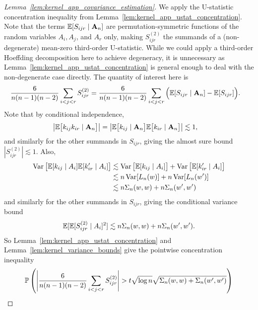 \begin{proof}[Lemma~\ref{lem:kernel_app_covariance_estimation}]
  We apply the U-statistic concentration inequality from
  Lemma~\ref{lem:kernel_app_ustat_concentration}.
  Note that the terms
  $\mathbb{E}[S_{i j r} \mid \mathbf{A}_n]$
  are permutation-symmetric functions of
  the random variables
  $A_i, A_j$, and $A_r$ only,
  making $S_{i j r}^{(2)}$ the summands of
  a (non-degenerate) mean-zero third-order U-statistic.
  While we could apply a third-order Hoeffding decomposition
  here to achieve degeneracy,
  it is unnecessary as Lemma~\ref{lem:kernel_app_ustat_concentration}
  is general enough to deal with the non-degenerate case directly.
  The quantity of interest here is
  \begin{align*}
    \frac{6}{n(n-1)(n-2)}
    \sum_{i<j<r}
    S_{i j r}^{(2)}
    &=
    \frac{6}{n(n-1)(n-2)}
    \sum_{i<j<r}
    \Big(
      \mathbb{E}[S_{i j r} \mid \mathbf{A}_n]
      - \mathbb{E}[S_{i j r}]
    \Big).
  \end{align*}
  Note that by conditional independence,
  \begin{align*}
    \big|
    \mathbb{E}\big[
      k_{i j}k_{i r} \mid \mathbf{A}_n
    \big]
    \big|
    &=
    \big|
    \mathbb{E}\big[
      k_{i j} \mid \mathbf{A}_n
    \big]
    \mathbb{E}\big[
      k_{i r} \mid \mathbf{A}_n
    \big]
    \big|
    \lesssim 1,
  \end{align*}
  and similarly for the other summands in $S_{i j r}$,
  giving the almost sure bound
  $|S_{i j r}^{(2)}| \lesssim 1$. Also,
  \begin{align*}
    \operatorname{Var}\big[ \mathbb{E}[k_{i j} \mid A_i] \mathbb{E}[k_{i r}' \mid A_i] \big]
    &\lesssim
    \operatorname{Var}\big[\mathbb{E}[k_{i j} \mid A_i]\big]
    + \operatorname{Var}\big[\mathbb{E}[k_{i r}' \mid A_i]\big] \\
    &\lesssim
    n \operatorname{Var}[L_n(w)] + n \operatorname{Var}[L_n(w')] \\
    &\lesssim
    n \Sigma_n(w,w) + n \Sigma_n(w',w')
  \end{align*}
  and similarly for the other summands in $S_{i j r}$,
  giving the conditional variance bound
  \begin{align*}
    \mathbb{E}[\mathbb{E}[S_{i j r}^{(2)} \mid A_i]^2] \lesssim
    n \Sigma_n(w,w) + n \Sigma_n(w',w').
  \end{align*}
  So Lemma~\ref{lem:kernel_app_ustat_concentration}
  and Lemma~\ref{lem:kernel_variance_bounds}
  give the pointwise concentration inequality
  \begin{align*}
    &\P\left(
      \Bigg|
      \frac{6}{n(n-1)(n-2)}
      \sum_{i<j<r}
      S_{i j r}^{(2)}
      \Bigg|
      > t \sqrt{\log n} \sqrt{\Sigma_n(w,w) + \Sigma_n(w',w')}
    \right) \\

\end{align*}
\end{proof}
